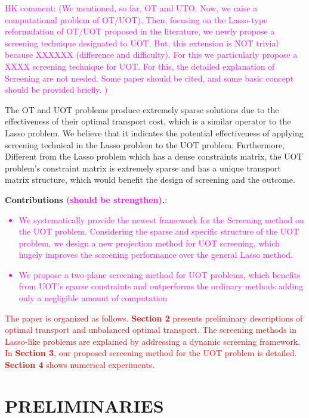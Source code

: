 \documentclass[twoside]{article}
\theoremstyle{plain}
\newcommand{\changeHK}[1]{\textcolor{red}{#1}}
\newcommand{\note}[1]{\textcolor{magenta}{#1}}
\begin{document}
\note{HK comment: (We mentioned, so far, OT and UTO. Now, we raise a computational problem of OT/UOT). Then, focusing on the Lasso-type reformulation of OT/UOT proposed in the literature, we newly propose a screening technique designated to UOT. But, this extension is NOT trivial because XXXXXX (difference and difficulty). For this we particularly propose a XXXX screening technique for UOT. For this, the detailed explanation  of Screening are not needed. Some paper should be cited, and some basic concept should be provided briefly. ) }


The OT and UOT problems produce extremely sparse solutions due to the effectiveness of their optimal transport cost, which is a similar operator to the Lasso problem. We believe that it indicates the potential effectiveness of applying screening technical in the Lasso problem to the UOT problem. Furthermore, Different from the Lasso problem which has a dense constraints matrix, the UOT problem's constraint matrix is extremely sparse and has a unique transport matrix structure, which would benefit the design of screening and the outcome.


\textbf{Contributions \note{(should be strengthen)}.}: 
\note{
\begin{itemize}
\item We systematically provide the newest framework for the Screening method on the UOT problem. Considering the sparse and specific structure of the UOT problem, we design a new projection method for UOT screening, which hugely improves the screening performance over the general Lasso method.
\item We propose a two-plane screening method for UOT problems, which benefits from UOT's sparse constraints and outperforms the ordinary methods adding only a negligible amount of computation
\end{itemize}
}

\changeHK{The paper is organized as follows. {\bf Section 2} presents preliminary descriptions of optimal transport and unbalanced optimal transport. The screening methods in Lasso-like problems are explained by addressing a dynamic screening framework. In {\bf Section 3}, our proposed screening method for the UOT problem is detailed.  {\bf Section 4} shows numerical experiments. }

\section{PRELIMINARIES}
\end{document}
